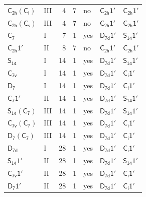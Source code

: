 \documentclass[10pt,a4paper]{article}
\numberwithin{equation}{section}
\newcommand{\grp}[1]{\mathsf{#1}}
\begin{document}
{\begin{longtable}{@{}llrrlll@{}}
\href{C2h-S2.pdf}{$\grp{C_{2h}}(\grp{C_{i}})$} & III & 4 & 7 & no & \href{C2h-1p.pdf}{$\grp{C_{2h}1'}$} & \href{C2h-1p.pdf}{$\grp{C_{2h}1'}$}\\
\href{C2h-C1v.pdf}{$\grp{C_{2h}}(\grp{C_{s}})$} & III & 4 & 7 & no & \href{C2h-1p.pdf}{$\grp{C_{2h}1'}$} & \href{C2h-1p.pdf}{$\grp{C_{2h}1'}$}\\
\href{../../../rotation/data/pdf/C7.pdf}{$\grp{C_{7}}$} & I & 7 & 1 & yes & \href{D7d-1p.pdf}{$\grp{D_{7d}1'}$} & \href{S14-1p.pdf}{$\grp{S_{14}1'}$}\\
\href{C2h-1p.pdf}{$\grp{C_{2h}1'}$} & II & 8 & 7 & no & \href{C2h-1p.pdf}{$\grp{C_{2h}1'}$} & \href{C2h-1p.pdf}{$\grp{C_{2h}1'}$}\\
\href{../../../rotation/data/pdf/S14.pdf}{$\grp{S_{14}}$} & I & 14 & 1 & yes & \href{D7d-1p.pdf}{$\grp{D_{7d}1'}$} & \href{S14-1p.pdf}{$\grp{S_{14}1'}$}\\
\href{../../../rotation/data/pdf/C7v.pdf}{$\grp{C_{7v}}$} & I & 14 & 1 & yes & \href{D7d-1p.pdf}{$\grp{D_{7d}1'}$} & \href{S2-1p.pdf}{$\grp{C_{i}1'}$}\\
\href{../../../rotation/data/pdf/D7.pdf}{$\grp{D_{7}}$} & I & 14 & 1 & yes & \href{D7d-1p.pdf}{$\grp{D_{7d}1'}$} & \href{S2-1p.pdf}{$\grp{C_{i}1'}$}\\
\href{C7-1p.pdf}{$\grp{C_{7}1'}$} & II & 14 & 1 & yes & \href{D7d-1p.pdf}{$\grp{D_{7d}1'}$} & \href{S14-1p.pdf}{$\grp{S_{14}1'}$}\\
\href{S14-C7.pdf}{$\grp{S_{14}}(\grp{C_{7}})$} & III & 14 & 1 & yes & \href{D7d-1p.pdf}{$\grp{D_{7d}1'}$} & \href{S14-1p.pdf}{$\grp{S_{14}1'}$}\\
\href{C7v-C7.pdf}{$\grp{C_{7v}}(\grp{C_{7}})$} & III & 14 & 1 & yes & \href{D7d-1p.pdf}{$\grp{D_{7d}1'}$} & \href{S2-1p.pdf}{$\grp{C_{i}1'}$}\\
\href{D7-C7.pdf}{$\grp{D_{7}}(\grp{C_{7}})$} & III & 14 & 1 & yes & \href{D7d-1p.pdf}{$\grp{D_{7d}1'}$} & \href{S2-1p.pdf}{$\grp{C_{i}1'}$}\\
\href{../../../rotation/data/pdf/D7d.pdf}{$\grp{D_{7d}}$} & I & 28 & 1 & yes & \href{D7d-1p.pdf}{$\grp{D_{7d}1'}$} & \href{S2-1p.pdf}{$\grp{C_{i}1'}$}\\
\href{S14-1p.pdf}{$\grp{S_{14}1'}$} & II & 28 & 1 & yes & \href{D7d-1p.pdf}{$\grp{D_{7d}1'}$} & \href{S14-1p.pdf}{$\grp{S_{14}1'}$}\\
\href{C7v-1p.pdf}{$\grp{C_{7v}1'}$} & II & 28 & 1 & yes & \href{D7d-1p.pdf}{$\grp{D_{7d}1'}$} & \href{S2-1p.pdf}{$\grp{C_{i}1'}$}\\
\href{D7-1p.pdf}{$\grp{D_{7}1'}$} & II & 28 & 1 & yes & \href{D7d-1p.pdf}{$\grp{D_{7d}1'}$} & \href{S2-1p.pdf}{$\grp{C_{i}1'}$}\\

\end{longtable}}
\end{document}
